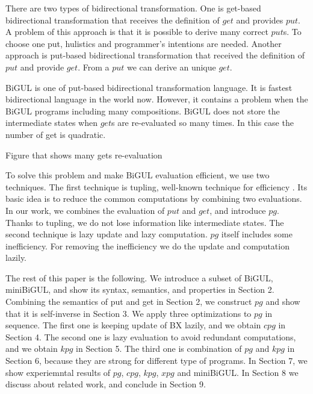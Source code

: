 There are two types of bidirectional transformation. One is get-based bidirectional transformation \cite{} that receives the definition of $get$ and provides $put$. A problem of this approach is that it is possible to derive many correct $put$s. To choose one put, hulistics and programmer's intentions are needed. Another approach is put-based bidirectional transformation \cite{} that received the definition of $put$ and provide $get$. From a $put$ we can derive an unique $get$. 

BiGUL \cite{} is one of put-based bidirectional transformation language. It is fastest bidirectional language in the world now. However, it contains a problem when the BiGUL programs including many compositions. BiGUL does not store the intermediate states when $get$s are re-evaluated so many times. In this case the number of get is quadratic.

\vspace{5mm}

Figure that shows many gets re-evaluation 

\vspace{5mm}


To solve this problem and make BiGUL evaluation efficient, we use two techniques. The first technique is tupling, well-known technique for efficiency \cite{}. Its basic idea is to reduce the common computations by combining two evaluations. In our work, we combines the evaluation of $put$ and $get$, and introduce $pg$. Thanks to tupling, we do not lose information like intermediate states.
The second technique is lazy update and lazy computation. $pg$ itself includes some inefficiency. For removing the inefficiency we do the update and computation lazily.

The rest of this paper is the following. We introduce a subset of BiGUL, miniBiGUL, and show its syntax, semantics, and properties in Section 2. Combining the semantics of put and get in Section 2, we construct $pg$ and show that it is self-inverse in Section 3.
We apply three optimizations to $pg$ in sequence. The first one is keeping update of BX lazily, and we obtain $cpg$ in Section 4. The second one is lazy evaluation to avoid redundant computations, and we obtain $kpg$ in Section 5. The third one is combination of $pg$ and $kpg$ in Section 6, because they are strong for different type of programs. In Section 7, we show experiemntal results of $pg$, $cpg$, $kpg$, $xpg$ and miniBiGUL.
In Section 8 we discuss about related work, and conclude in Section 9.


